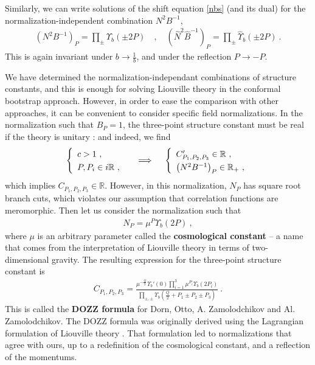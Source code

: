 \documentclass[12pt, a4paper, notitlepage, twoside]{report}
\numberwithin{equation}{section}
\theoremstyle{break}
\begin{document}
Similarly, we can write solutions of the shift equation \eqref{nbs} (and its dual) for the normalization-independent combination $N^2B^{-1}$,
\begin{align}
 \boxed{\left(N^2B^{-1}\right)_P =\prod_\pm \Upsilon_b(\pm 2P)} \quad , \quad \boxed{\left(\hat N^2\hat B^{-1}\right)_P = \prod_\pm \hat\Upsilon_b(\pm 2P) } \ .
\end{align}
This is again invariant under $b\to \frac{1}{b}$, and under the reflection $P\to -P$.

We have determined the normalization-independant combinations of structure constants, and this is enough for solving Liouville theory in the conformal bootstrap approach. However, in order to ease the comparison with other approaches, it can be convenient to consider specific field normalizations. 
In the normalization such that $B_P=1$, the three-point structure constant must be real if the theory is unitary \cite{rib14b}: and indeed, we find
\begin{align}
\renewcommand{\arraystretch}{1.3}
 \left\{\begin{array}{l} c > 1\ , \\ P,P_i\in i\mathbb{R}\ , \end{array}\right. \quad \implies \quad \left\{\begin{array}{l} C'_{P_1,P_2,P_3}\in\mathbb{R}\ , \\ \left(N^2B^{-1}\right)_P\in \mathbb{R}_+\ , \end{array}\right.
\end{align}
which implies $C_{P_1,P_2,P_3}\in \mathbb{R}$. However, in this normalization, $N_P$ has square root branch cuts, which violates our assumption that correlation functions are meromorphic. Then let us  consider the normalization such that 
\begin{align}
 N_P = \mu^{P}\Upsilon_b(2P)\ ,
 \label{nop}
\end{align}
where $\mu$ is an arbitrary parameter called the \textbf{\boldmath cosmological constant} -- a name that comes from the interpretation of Liouville theory in terms of two-dimensional gravity.
The resulting expression for the three-point structure constant is
\begin{align}
 C_{P_1,P_2,P_3} =  \frac{\mu^{-\frac{Q}{2}}\Upsilon_b'(0)\prod_{i=1}^3 \mu^{P_i}\Upsilon_b(2P_i) }{\prod_{\pm,\pm} \Upsilon_b\left(\tfrac{Q}{2}+P_1\pm P_2 \pm P_3\right)} \ .
\label{caaa}
\end{align}
This is called the \textbf{\boldmath DOZZ formula} for Dorn, Otto, A.
Zamolodchikov and Al. Zamolodchikov. 
The DOZZ formula was originally derived using the Lagrangian formulation of Liouville theory \cite{zz95}. 
That formulation led to normalizations that agree with ours, 
up to a redefinition of the cosmological constant, and a reflection of the momentums. 
\end{document}
